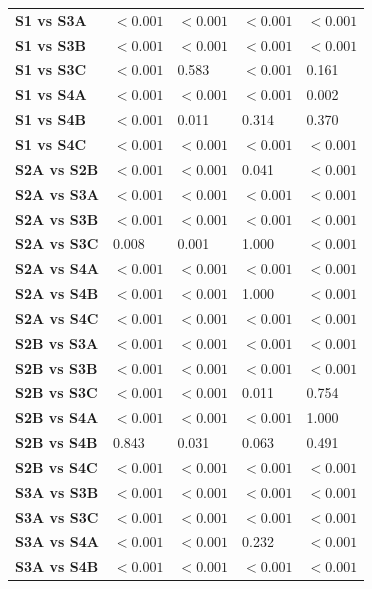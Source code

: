 \begin{table}[H]
{\begin{tabular}{lllll}
        \textbf{S1 vs S3A} & $< 0.001$ & $< 0.001$ & $< 0.001$ & $< 0.001$ \\
        \textbf{S1 vs S3B} & $< 0.001$ & $< 0.001$ & $< 0.001$ & $< 0.001$ \\
        \textbf{S1 vs S3C} & $< 0.001$ & 0.583 & $< 0.001$ & 0.161 \\
        \textbf{S1 vs S4A} & $< 0.001$ & $< 0.001$ & $< 0.001$ & 0.002 \\
        \textbf{S1 vs S4B} & $< 0.001$ & 0.011 & 0.314 & 0.370 \\
        \textbf{S1 vs S4C} & $< 0.001$ & $< 0.001$ & $< 0.001$ & $< 0.001$ \\
        \textbf{S2A vs S2B} & $< 0.001$ & $< 0.001$ & 0.041 & $< 0.001$ \\
        \textbf{S2A vs S3A} & $< 0.001$ & $< 0.001$ & $< 0.001$ & $< 0.001$ \\
        \textbf{S2A vs S3B} & $< 0.001$ & $< 0.001$ & $< 0.001$ & $< 0.001$ \\
        \textbf{S2A vs S3C} & 0.008 & 0.001 & 1.000 & $< 0.001$ \\
        \textbf{S2A vs S4A} & $< 0.001$ & $< 0.001$ & $< 0.001$ & $< 0.001$ \\
        \textbf{S2A vs S4B} & $< 0.001$ & $< 0.001$ & 1.000 & $< 0.001$ \\
        \textbf{S2A vs S4C} & $< 0.001$ & $< 0.001$ & $< 0.001$ & $< 0.001$ \\
        \textbf{S2B vs S3A} & $< 0.001$ & $< 0.001$ & $< 0.001$ & $< 0.001$ \\
        \textbf{S2B vs S3B} & $< 0.001$ & $< 0.001$ & $< 0.001$ & $< 0.001$ \\
        \textbf{S2B vs S3C} & $< 0.001$ & $< 0.001$ & 0.011 & 0.754 \\
        \textbf{S2B vs S4A} & $< 0.001$ & $< 0.001$ & $< 0.001$ & 1.000 \\
        \textbf{S2B vs S4B} & 0.843 & 0.031 & 0.063 & 0.491 \\
        \textbf{S2B vs S4C} & $< 0.001$ & $< 0.001$ & $< 0.001$ & $< 0.001$ \\
        \textbf{S3A vs S3B} & $< 0.001$ & $< 0.001$ & $< 0.001$ & $< 0.001$ \\
        \textbf{S3A vs S3C} & $< 0.001$ & $< 0.001$ & $< 0.001$ & $< 0.001$ \\
        \textbf{S3A vs S4A} & $< 0.001$ & $< 0.001$ & 0.232 & $< 0.001$ \\
        \textbf{S3A vs S4B} & $< 0.001$ & $< 0.001$ & $< 0.001$ & $< 0.001$ \\

\end{tabular}}
\end{table}
